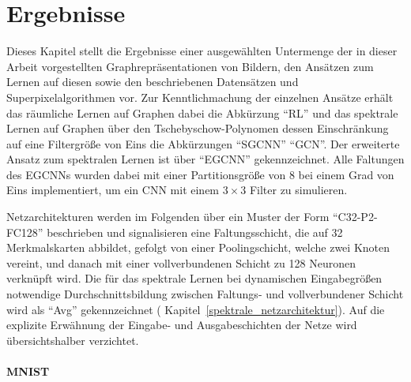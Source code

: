\section{Ergebnisse}
\label{ergebnisse}

Dieses Kapitel stellt die Ergebnisse einer ausgewählten Untermenge der in dieser Arbeit vorgestellten Graphrepräsentationen von Bildern, den Ansätzen zum Lernen auf diesen sowie den beschriebenen Datensätzen und Superpixelalgorithmen vor.
Zur Kenntlichmachung der einzelnen Ansätze erhält das räumliche Lernen auf Graphen dabei die Abkürzung \enquote{\acs{RL}} und das spektrale Lernen auf Graphen über den Tschebyschow-Polynomen \bzw{} dessen Einschränkung auf eine Filtergröße von Eins die Abkürzungen \enquote{\acs{SGCNN}} \bzw{} \enquote{\acs{GCN}}.
Der erweiterte Ansatz zum spektralen Lernen ist über \enquote{\acs{EGCNN}} gekennzeichnet.
Alle Faltungen des \acs{EGCNN}s wurden dabei mit einer Partitionsgröße von $8$ bei einem Grad von Eins implementiert, um ein \gls{CNN} mit einem $3 \times 3$ Filter zu simulieren.

Netzarchitekturen werden im Folgenden \bspw{} über ein Muster der Form \enquote{C32-P2-FC128} beschrieben und signalisieren eine Faltungsschicht, die auf 32 Merkmalskarten abbildet, gefolgt von einer Poolingschicht, welche zwei Knoten vereint, und danach mit einer vollverbundenen Schicht zu 128 Neuronen verknüpft wird.
Die für das spektrale Lernen bei dynamischen Eingabegrößen notwendige Durchschnittsbildung zwischen Faltungs- und vollverbundener Schicht wird als \enquote{Avg} gekennzeichnet (\vgl{} Kapitel~\ref{spektrale_netzarchitektur}).
Auf die explizite Erwähnung der Eingabe- und Ausgabeschichten der Netze wird übersichtshalber verzichtet.

\paragraph{\gls{MNIST}}

